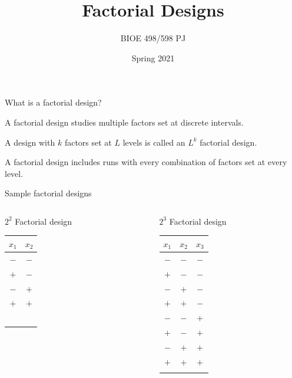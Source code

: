 \documentclass[10pt]{beamer}
\title{Factorial Designs}
\author{BIOE 498/598 PJ}
\date{Spring 2021}
\newcommand\lo{\ensuremath{\boldsymbol{-}}}
\newcommand\hi{\ensuremath{\boldsymbol{+}}}
\begin{document}
\frame{\titlepage}


\begin{frame}{What is a factorial design?}

A factorial design studies multiple factors set at discrete intervals.

\pause
\bigskip
A design with $k$ factors set at $L$ levels is called an $L^k$ factorial design.

\pause
\bigskip
A factorial design includes runs with every combination of factors set at every level.

	
\end{frame}

\begin{frame}{Sample factorial designs}

\begin{columns}

\begin{column}{0.3\textwidth}
\begin{center}
$2^2$ Factorial design\\
\begin{tabular}{cc}
$x_1$ & $x_2$ \\
\hline
\lo & \lo \\
\hi & \lo \\
\lo & \hi \\
\hi & \hi \\
 & \\
 & \\
 & \\
 & \\
 & \\
\end{tabular}
\end{center}
\end{column}

\begin{column}{0.3\textwidth}
\begin{center}
$2^3$ Factorial design\\
\begin{tabular}{ccc}
$x_1$ & $x_2$ & $x_3$ \\
\hline
\lo & \lo & \lo \\
\hi & \lo & \lo \\
\lo & \hi & \lo \\
\hi & \hi & \lo \\
\lo & \lo & \hi \\
\hi & \lo & \hi \\
\lo & \hi & \hi \\
\hi & \hi & \hi \\
 & \\
\end{tabular}
\end{center}
\end{column}


\end{columns}
\end{frame}
\end{document}
